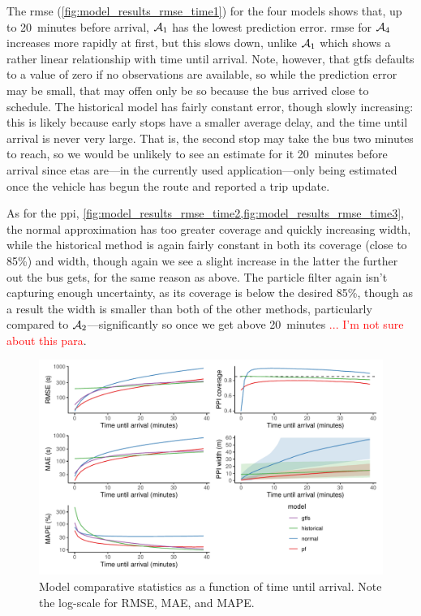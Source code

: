 The \gls{rmse} (\cref{fig:model_results_rmse_time1}) for the four models shows that, up to 20~minutes before arrival, $\mathcal{A}_1$ has the lowest prediction error. \Gls{rmse} for $\mathcal{A}_4$ increases more rapidly at first, but this slows down, unlike $\mathcal{A}_1$ which shows a rather linear relationship with time until arrival.  Note, however, that \gls{gtfs} defaults to a value of zero if no observations are available, so while the prediction error may be small, that may offen only be so because the bus arrived close to schedule. The historical model has fairly constant error, though slowly increasing: this is likely because early stops have a smaller average delay, and the time until arrival is never very large. That is, the second stop may take the bus two minutes to reach, so we would be unlikely to see an estimate for it 20~minutes before arrival since \glspl{eta} are---in the currently used application---only being estimated once the vehicle has begun the route and reported a trip update.


As for the \gls{ppi}, \cref{fig:model_results_rmse_time2,fig:model_results_rmse_time3}, the normal approximation has too greater coverage and quickly increasing width, while the historical method is again fairly constant in both its coverage (close to 85\%) and width, though again we see a slight increase in the latter the further out the bus gets, for the same reason as above. The particle filter again isn't capturing enough uncertainty, as its coverage is below the desired 85\%, though as a result the width is smaller than both of the other methods, particularly compared to $\mathcal{A}_2$---significantly so once we get above 20~minutes  \textcolor{red}{... I'm not sure about this para}.


\begin{knitrout}\small
{}\color{fgcolor}\begin{figure}
\includegraphics[width=\textwidth]{figure/model_results_rmse_time-1} \caption[Model comparative statistics as a function of time until arrival]{Model comparative statistics as a function of time until arrival. Note the log-scale for RMSE, MAE, and MAPE.}\label{fig:model_results_rmse_time}
\end{figure}


\end{knitrout}



